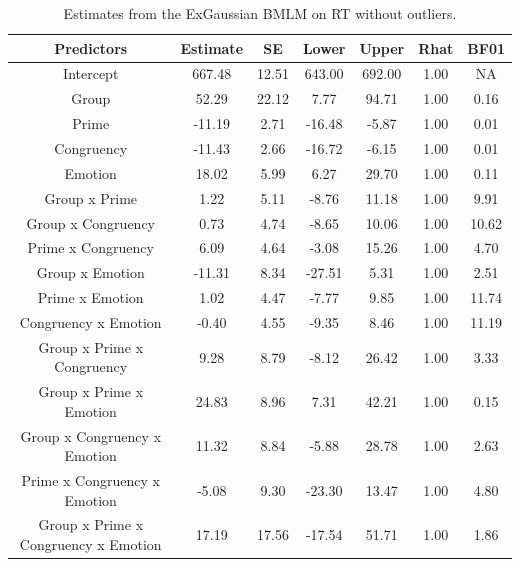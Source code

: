 \documentclass[
  11pt,
  english,
  ,doc,floatsintext]{apa6}
\begin{document}
\begin{table}[htb]

\begin{center}
\begin{threeparttable}

\caption{\label{tab:summaryBMwo}Estimates from the ExGaussian BMLM on RT without outliers.}

\small{

\begin{tabular}{ccccccc}
\toprule
Predictors & \multicolumn{1}{c}{Estimate} & \multicolumn{1}{c}{SE} & \multicolumn{1}{c}{Lower} & \multicolumn{1}{c}{Upper} & \multicolumn{1}{c}{Rhat} & \multicolumn{1}{c}{BF01}\\
\midrule
Intercept & 667.48 & 12.51 & 643.00 & 692.00 & 1.00 & NA\\
Group & 52.29 & 22.12 & 7.77 & 94.71 & 1.00 & 0.16\\
Prime & -11.19 & 2.71 & -16.48 & -5.87 & 1.00 & 0.01\\
Congruency & -11.43 & 2.66 & -16.72 & -6.15 & 1.00 & 0.01\\
Emotion & 18.02 & 5.99 & 6.27 & 29.70 & 1.00 & 0.11\\
Group x Prime & 1.22 & 5.11 & -8.76 & 11.18 & 1.00 & 9.91\\
Group x Congruency & 0.73 & 4.74 & -8.65 & 10.06 & 1.00 & 10.62\\
Prime x Congruency & 6.09 & 4.64 & -3.08 & 15.26 & 1.00 & 4.70\\
Group x Emotion & -11.31 & 8.34 & -27.51 & 5.31 & 1.00 & 2.51\\
Prime x Emotion & 1.02 & 4.47 & -7.77 & 9.85 & 1.00 & 11.74\\
Congruency x Emotion & -0.40 & 4.55 & -9.35 & 8.46 & 1.00 & 11.19\\
Group x Prime x Congruency & 9.28 & 8.79 & -8.12 & 26.42 & 1.00 & 3.33\\
Group x Prime x Emotion & 24.83 & 8.96 & 7.31 & 42.21 & 1.00 & 0.15\\
Group x Congruency x Emotion & 11.32 & 8.84 & -5.88 & 28.78 & 1.00 & 2.63\\
Prime x Congruency x Emotion & -5.08 & 9.30 & -23.30 & 13.47 & 1.00 & 4.80\\
Group x Prime x Congruency x Emotion & 17.19 & 17.56 & -17.54 & 51.71 & 1.00 & 1.86\\
\bottomrule
\end{tabular}

}

\end{threeparttable}
\end{center}

\end{table}
\end{document}

